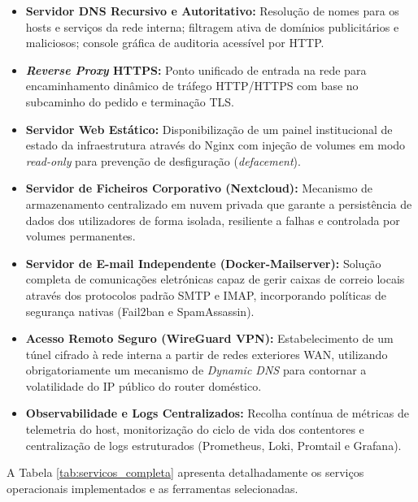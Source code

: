 \begin{itemize}
    \item \textbf{Servidor DNS Recursivo e Autoritativo:} Resolução de nomes para os hosts e serviços da rede interna; filtragem ativa de domínios publicitários e maliciosos; console gráfica de auditoria acessível por HTTP.
    \item \textbf{\textit{Reverse Proxy} HTTPS:} Ponto unificado de entrada na rede para encaminhamento dinâmico de tráfego HTTP/HTTPS com base no subcaminho do pedido e terminação TLS.
    \item \textbf{Servidor Web Estático:} Disponibilização de um painel institucional de estado da infraestrutura através do Nginx com injeção de volumes em modo \textit{read-only} para prevenção de desfiguração (\textit{defacement}).
    \item \textbf{Servidor de Ficheiros Corporativo (Nextcloud):} Mecanismo de armazenamento centralizado em nuvem privada que garante a persistência de dados dos utilizadores de forma isolada, resiliente a falhas e controlada por volumes permanentes.
    \item \textbf{Servidor de E-mail Independente (Docker-Mailserver):} Solução completa de comunicações eletrónicas capaz de gerir caixas de correio locais através dos protocolos padrão SMTP e IMAP, incorporando políticas de segurança nativas (Fail2ban e SpamAssassin).
    \item \textbf{Acesso Remoto Seguro (WireGuard VPN):} Estabelecimento de um túnel cifrado à rede interna a partir de redes exteriores WAN, utilizando obrigatoriamente um mecanismo de \textit{Dynamic DNS} para contornar a volatilidade do IP público do router doméstico.
    \item \textbf{Observabilidade e Logs Centralizados:} Recolha contínua de métricas de telemetria do host, monitorização do ciclo de vida dos contentores e centralização de logs estruturados (Prometheus, Loki, Promtail e Grafana).
\end{itemize}

A Tabela \ref{tab:servicos_completa} apresenta detalhadamente os serviços operacionais implementados e as ferramentas selecionadas.

